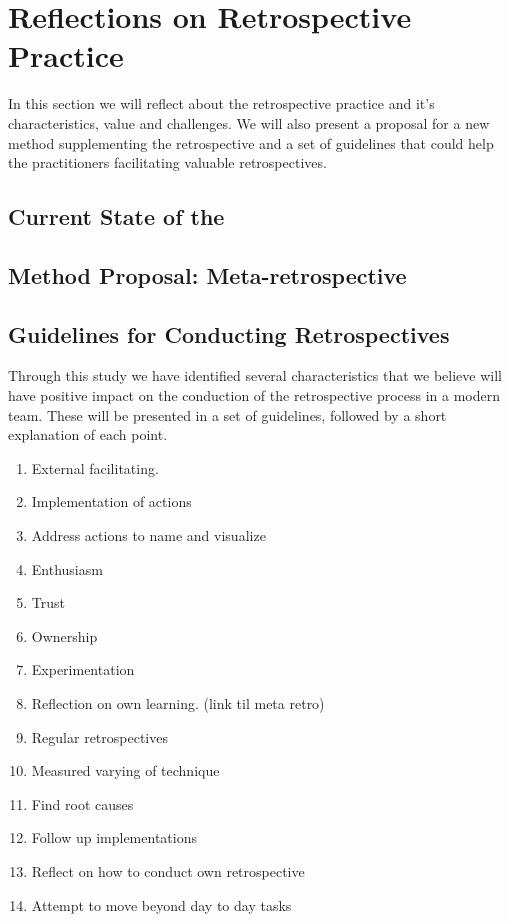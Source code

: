 \clearpage

\section{Reflections on Retrospective Practice}
In this section we will reflect about the retrospective practice and it's characteristics, value and challenges. We will also present a proposal for a new method supplementing the retrospective and a set of guidelines that could help the practitioners facilitating valuable retrospectives. 

\subsection{Current State of the}

\subsection{Method Proposal: Meta-retrospective}
\label{section:Method-propsal}

\subsection{Guidelines for Conducting Retrospectives}

Through this study we have identified several characteristics that we believe will have positive impact on the conduction of the retrospective process in a modern team. These will be presented in a set of guidelines, followed by a short explanation of each point.

\begin{enumerate}
	\item External facilitating.
	\item Implementation of actions 
	\item Address actions to name and visualize
	\item Enthusiasm
	\item Trust
	\item Ownership
	\item Experimentation
	\item Reflection on own learning. (link til meta retro)
	\item Regular retrospectives
	\item Measured varying of technique
	\item Find root causes
	\item Follow up implementations
	\item Reflect on how to conduct own retrospective
	\item Attempt to move beyond day to day tasks
\end{enumerate}

